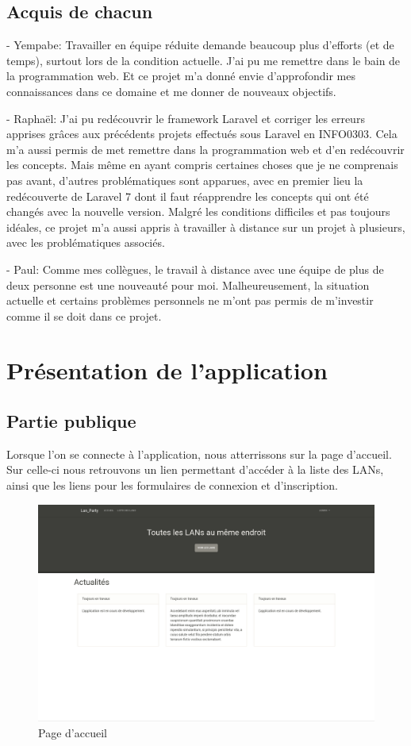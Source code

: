 \documentclass[12pt]{article}
\begin{document}
\subsection{Acquis de chacun}

- Yempabe: Travailler en équipe réduite demande beaucoup plus d'efforts (et de temps), surtout lors de la condition actuelle. J'ai pu me remettre dans le bain de la programmation web. Et ce projet m'a donné envie d'approfondir mes connaissances dans ce domaine et me donner de nouveaux objectifs.


- Raphaël: J'ai pu redécouvrir le framework Laravel et corriger les erreurs apprises grâces aux précédents projets effectués sous Laravel en INFO0303. Cela m'a aussi permis de met remettre dans la programmation web et d'en redécouvrir les concepts. Mais même en ayant compris certaines choses que je ne comprenais pas avant, d'autres problématiques sont apparues, avec en premier lieu la redécouverte de Laravel 7 dont il faut réapprendre les concepts qui ont été changés avec la nouvelle version. Malgré les conditions difficiles et pas toujours idéales, ce projet m'a aussi appris à travailler à distance sur un projet à plusieurs, avec les problématiques associés.


- Paul: Comme mes collègues, le travail à distance avec une équipe de plus de deux personne est une nouveauté pour moi. Malheureusement, la situation actuelle et certains problèmes personnels ne m'ont pas permis de m'investir comme il se doit dans ce projet.
\newpage

\section{Présentation de l'application}

\subsection{Partie publique}
Lorsque l'on se connecte à l'application, nous atterrissons sur la page d'accueil. Sur celle-ci nous retrouvons un lien permettant d'accéder à la liste des LANs, ainsi que les liens pour les formulaires de connexion et d'inscription.

\begin{figure}[H]
\centering
\includegraphics[scale=0.20]{images/accueil.png}
\caption{Page d'accueil}
\label{}
\end{figure}
\end{document}
